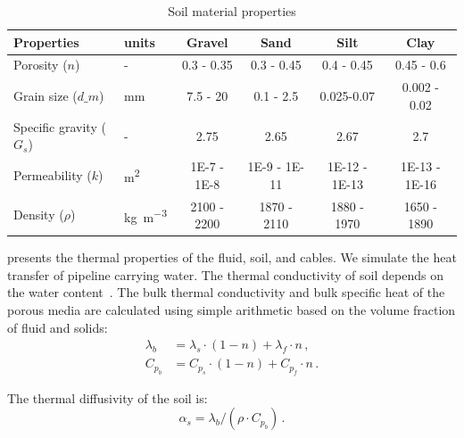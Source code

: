\documentclass[Journal,letterpaper,InsideFigs]{ascelike-new}
\begin{document}
\begin{table}[!tb]
\caption{Soil material properties}
\label{tab:soil}
\begin{tabular}{llcccc}
\toprule
\textbf{Properties}           &   \textbf{units}                      & \textbf{Gravel} & \textbf{Sand} & \textbf{Silt} & \textbf{Clay} \\
\midrule
Porosity ($n$)                  & -                       & 0.3 - 0.35      & 0.3 - 0.45    & 0.4 - 0.45    & 0.45 - 0.6    \\
Grain size ($d\_m$)             & \si{\milli\meter}                      & 7.5 - 20        & 0.1 - 2.5     & 0.025-0.07    & 0.002 - 0.02  \\
Specific gravity ($G_s$)         & -                       & 2.75            & 2.65          & 2.67          & 2.7           \\
Permeability ($k$)              & \si{\meter\squared}    & 1E-7 - 1E-8     & 1E-9 - 1E-11  & 1E-12 - 1E-13 & 1E-13 - 1E-16 \\
Density ($\rho$) & \si{\kilo\gram\per\meter\cubed} & 2100 - 2200     & 1870 - 2110   & 1880 - 1970   & 1650 - 1890  \\
\bottomrule
\end{tabular}
\end{table}

 presents the thermal properties of the fluid, soil, and cables. We simulate the heat transfer of pipeline carrying water. The thermal conductivity of soil depends on the water content~\cite{young2001utilizing}. The bulk thermal conductivity and bulk specific heat of the porous media are calculated using simple arithmetic based on the volume fraction of fluid and solids:
\begin{align}
\lambda_b &= \lambda_s \cdot (1 - n) + \lambda_f  \cdot  n\,,\\
C_{p_b} &= C_{p_s}  \cdot (1 - n) + C_{p_f}  \cdot  n\,.
\end{align}

The thermal diffusivity of the soil is:
\begin{equation}
\alpha_s = \lambda_b / (\rho  \cdot  C_{p_b})\,.
\end{equation}
\end{document}
